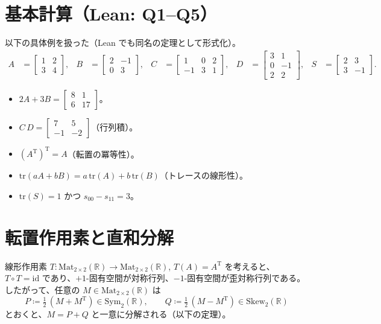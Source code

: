 \documentclass[luatexja,ja=standard,a4paper,12pt]{bxjsarticle}
\newcommand{\R}{\mathbb{R}}
\newcommand{\Mat}{\mathrm{Mat}}
\newcommand{\MatTwo}{\Mat_{2\times 2}(\R)}
\newcommand{\Sym}{\mathrm{Sym}_2(\R)}
\newcommand{\Skew}{\mathrm{Skew}_2(\R)}
\newcommand{\tr}{\mathrm{tr}}
\newcommand{\TT}{\mathrm{T}}
\theoremstyle{definition}
\theoremstyle{plain}
\theoremstyle{remark}
\begin{document}
\section{基本計算（Lean: Q1–Q5）}
以下の具体例を扱った（Lean でも同名の定理として形式化）。
\begin{align*}
  A&=\begin{bmatrix}1&2\\[2pt]3&4\end{bmatrix},&
  B&=\begin{bmatrix}2&-1\\[2pt]0&3\end{bmatrix},&
  C&=\begin{bmatrix}1&0&2\\[2pt]-1&3&1\end{bmatrix},&
  D&=\begin{bmatrix}3&1\\[2pt]0&-1\\[2pt]2&2\end{bmatrix},&
  S&=\begin{bmatrix}2&3\\[2pt]3&-1\end{bmatrix}.
\end{align*}
\begin{itemize}
  \item[Q1] $2A+3B=\begin{bmatrix}8&1\\[2pt]6&17\end{bmatrix}$。
  \item[Q2] $C\,D=\begin{bmatrix}7&5\\[2pt]-1&-2\end{bmatrix}$（行列積）。
  \item[Q3] $(A^{\TT})^{\TT}=A$（転置の冪等性）。
  \item[Q4] $\tr(aA+bB)=a\,\tr(A)+b\,\tr(B)$（トレースの線形性）。
  \item[Q5] $\tr(S)=1$ かつ $s_{00}-s_{11}=3$。
\end{itemize}

\section{転置作用素と直和分解}
線形作用素 $T:\MatTwo\to\MatTwo$, $T(A)=A^{\TT}$ を考えると、$T\circ T=\mathrm{id}$ であり、$+1$-固有空間が対称行列、$-1$-固有空間が歪対称行列である。したがって、任意の $M\in\MatTwo$ は
\[
  P\coloneqq \tfrac12\,(M+M^{\TT})\in\Sym,\qquad
  Q\coloneqq \tfrac12\,(M-M^{\TT})\in\Skew
\]
とおくと、$M=P+Q$ と一意に分解される（以下の定理）。
\end{document}
